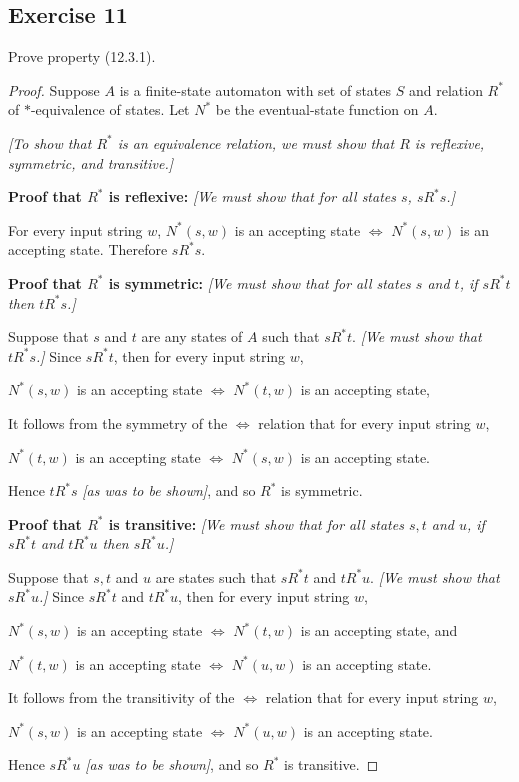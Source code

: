 \documentclass[14pt]{extarticle}
\begin{document}
\subsection{Exercise 11}
Prove property (12.3.1).
\begin{proof}
Suppose \(A\) is a finite-state automaton with set of states \(S\) and relation \(R^*\) of \(*\)-equivalence of states. 
Let \(N^*\) be the eventual-state function on \(A\).

{\it [To show that \(R^*\) is an equivalence relation, we must show that \(R\) is reflexive, symmetric, and transitive.]}

{\bf Proof that \(R^*\) is reflexive:} {\it [We must show that for all states \(s\), \(sR^*s\).]}

For every input string \(w\), \(N^*(s, w)\) is an accepting state \(\iff\) \(N^*(s, w)\) is an accepting state. Therefore
\(sR^*s\).

{\bf Proof that \(R^*\) is symmetric:} {\it [We must show that for all states \(s\) and \(t\), if \(sR^*t\) then \(tR^*s\).]}

Suppose that \(s\) and \(t\) are any states of \(A\) such that \(sR^*t\). {\it [We must show that \(tR^*s\).]} Since 
\(sR^*t\), then for every input string \(w\),

\(N^*(s, w)\) is an accepting state \(\iff\) \(N^*(t, w)\) is an accepting state,

It follows from the symmetry of the \(\iff\) relation that for 
every input string \(w\), 

\(N^*(t, w)\) is an accepting state \(\iff\) \(N^*(s, w)\) is an accepting state.

Hence \(tR^*s\) {\it [as was to be shown]}, and so \(R^*\) is symmetric.

{\bf Proof that \(R^*\) is transitive:} {\it [We must show that for all states \(s, t\) and \(u\), if \(sR^*t\) and 
\(tR^*u\) then \(sR^*u\).]}

Suppose that \(s, t\) and \(u\) are states such that \(sR^*t\) and \(tR^*u\). {\it [We must show that \(sR^*u\).]} Since 
\(sR^*t\) and \(tR^*u\), then for every input string \(w\),

\(N^*(s, w)\) is an accepting state \(\iff\) \(N^*(t, w)\) is an accepting state, and

\(N^*(t, w)\) is an accepting state \(\iff\) \(N^*(u, w)\) is an accepting state.

It follows from the transitivity of the \(\iff\) relation that for every input string \(w\), 

\(N^*(s, w)\) is an accepting state \(\iff\) \(N^*(u, w)\) is an accepting state.

Hence \(sR^*u\) {\it [as was to be shown]}, and so \(R^*\) is transitive.
\end{proof}
\end{document}
